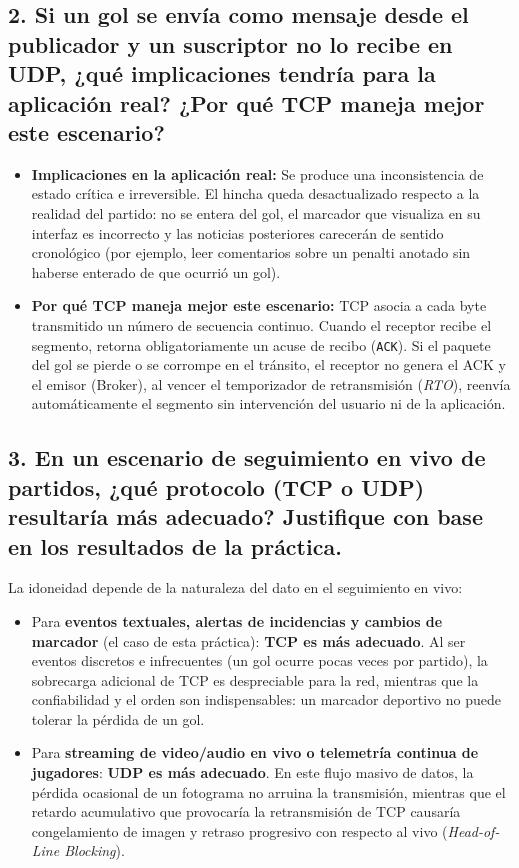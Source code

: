 \documentclass[11pt,a4paper]{article}
\begin{document}
\subsection{2. Si un gol se envía como mensaje desde el publicador y un suscriptor no lo recibe en UDP, ¿qué implicaciones tendría para la aplicación real? ¿Por qué TCP maneja mejor este escenario?}
\begin{itemize}
    \item \textbf{Implicaciones en la aplicación real:} Se produce una inconsistencia de estado crítica e irreversible. El hincha queda desactualizado respecto a la realidad del partido: no se entera del gol, el marcador que visualiza en su interfaz es incorrecto y las noticias posteriores carecerán de sentido cronológico (por ejemplo, leer comentarios sobre un penalti anotado sin haberse enterado de que ocurrió un gol).
    \item \textbf{Por qué TCP maneja mejor este escenario:} TCP asocia a cada byte transmitido un número de secuencia continuo. Cuando el receptor recibe el segmento, retorna obligatoriamente un acuse de recibo (\texttt{ACK}). Si el paquete del gol se pierde o se corrompe en el tránsito, el receptor no genera el ACK y el emisor (Broker), al vencer el temporizador de retransmisión (\textit{RTO}), reenvía automáticamente el segmento sin intervención del usuario ni de la aplicación.
\end{itemize}

\subsection{3. En un escenario de seguimiento en vivo de partidos, ¿qué protocolo (TCP o UDP) resultaría más adecuado? Justifique con base en los resultados de la práctica.}
La idoneidad depende de la naturaleza del dato en el seguimiento en vivo:
\begin{itemize}
    \item Para \textbf{eventos textuales, alertas de incidencias y cambios de marcador} (el caso de esta práctica): \textbf{TCP es más adecuado}. Al ser eventos discretos e infrecuentes (un gol ocurre pocas veces por partido), la sobrecarga adicional de TCP es despreciable para la red, mientras que la confiabilidad y el orden son indispensables: un marcador deportivo no puede tolerar la pérdida de un gol.
    \item Para \textbf{streaming de video/audio en vivo o telemetría continua de jugadores}: \textbf{UDP es más adecuado}. En este flujo masivo de datos, la pérdida ocasional de un fotograma no arruina la transmisión, mientras que el retardo acumulativo que provocaría la retransmisión de TCP causaría congelamiento de imagen y retraso progresivo con respecto al vivo (\textit{Head-of-Line Blocking}).
\end{itemize}
\end{document}
